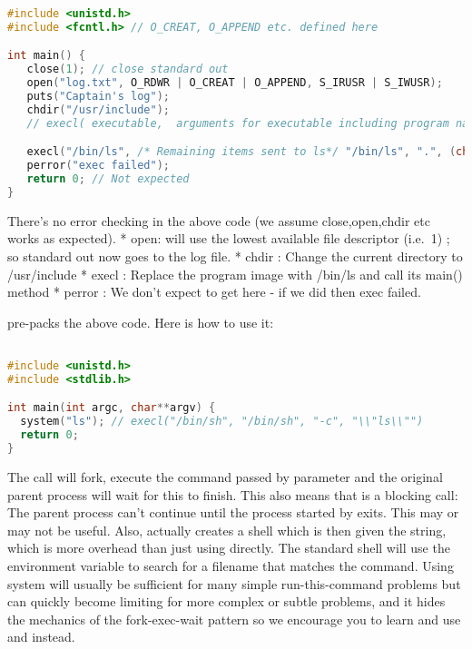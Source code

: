 \begin{lstlisting}[language=C]
#include <unistd.h>
#include <fcntl.h> // O_CREAT, O_APPEND etc. defined here

int main() {
   close(1); // close standard out
   open("log.txt", O_RDWR | O_CREAT | O_APPEND, S_IRUSR | S_IWUSR);
   puts("Captain's log");
   chdir("/usr/include");
   // execl( executable,  arguments for executable including program name and NULL at the end)

   execl("/bin/ls", /* Remaining items sent to ls*/ "/bin/ls", ".", (char *) NULL); // "ls ."
   perror("exec failed");
   return 0; // Not expected
}
\end{lstlisting}

There's no error checking in the above code (we assume close,open,chdir etc works as expected). * open: will use the lowest available file descriptor (i.e.~1) ; so standard out now goes to the log file. * chdir : Change the current directory to /usr/include * execl : Replace the program image with /bin/ls and call its main() method * perror : We don't expect to get here - if we did then exec failed.

 pre-packs the above code. Here is how to use it:

\begin{lstlisting}[language=C]

#include <unistd.h>
#include <stdlib.h>

int main(int argc, char**argv) {
  system("ls"); // execl("/bin/sh", "/bin/sh", "-c", "\\"ls\\"")
  return 0;
}
\end{lstlisting}

The  call will fork, execute the command passed by parameter and the original parent process will wait for this to finish. This also means that  is a blocking call: The parent process can't continue until the process started by  exits. This may or may not be useful. Also,  actually creates a shell which is then given the string, which is more overhead than just using  directly. The standard shell will use the  environment variable to search for a filename that matches the command. Using system will usually be sufficient for many simple run-this-command problems but can quickly become limiting for more complex or subtle problems, and it hides the mechanics of the fork-exec-wait pattern so we encourage you to learn and use   and  instead.

